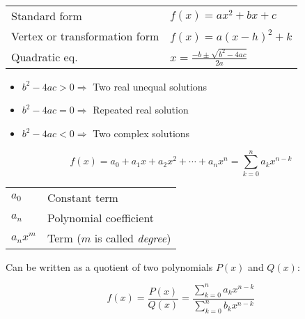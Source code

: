 
\begin{center}
  \begin{tabular}{ll}
    Standard form                  & $f(x) = ax^2 + bx + c$                   \\[.7em]
    Vertex or transformation form  & $f(x) = a(x - h)^2 + k$                  \\[.7em]
    Quadratic eq.                  & $x = \frac{-b \pm \sqrt{b^2 - 4ac}}{2a}$ \\[.7em]
  \end{tabular}
\end{center}

\begin{itemize}
    \item $b^2 - 4ac > 0 \Rightarrow$ Two real unequal solutions
    \item $b^2 - 4ac = 0 \Rightarrow$ Repeated real solution
    \item $b^2 - 4ac < 0 \Rightarrow$ Two complex solutions
\end{itemize}

\hformbar




\begin{equation}
  f(x) = a_0 + a_1x + a_2x^2 + \cdots + a_nx^n = \sum_{k=0}^n a_k x^{n-k}
\end{equation}

\begin{center}
  \begin{tabular}{ll}
    $a_0$     & Constant term                         \\
    $a_n$     & Polynomial coefficient                \\
    $a_nx^m$  & Term ($m$ is called \textit{degree})  \\
  \end{tabular}
\end{center}

\hformbar




Can be written as a quotient of two polynomials $P(x)$ and $Q(x)$:

\begin{equation}
  f(x) = \frac{P(x)}{Q(x)} = \frac{\sum_{k=0}^n a_k x^{n-k}}{\sum_{k=0}^n b_k x^{n-k}}
\end{equation}


